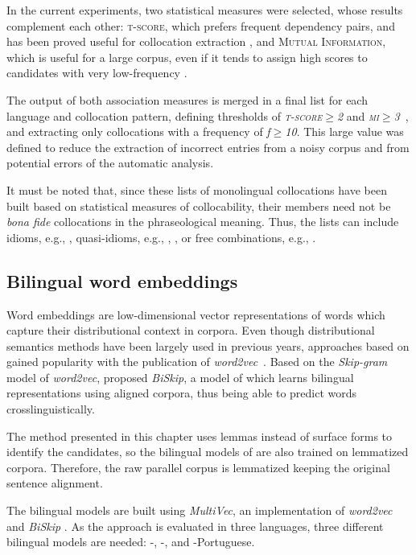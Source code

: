 \documentclass[output=paper,modfonts,nonflat]{langsci/langscibook}
\begin{document}
In the current experiments, two statistical measures were selected, whose results
complement each other: \textsc{t-score}, which prefers frequent dependency pairs,
and has been proved useful for collocation extraction \citep{krenn2001}, and
\textsc{Mutual Information}, which is useful for a large corpus, even if it
tends to assign high scores to candidates with very low-frequency \citep{pecina2010lexical}.

The output of both association measures is merged in a final list for each
language and collocation pattern, defining thresholds of \emph{\textsc{t-score$\geq$2}} and
\emph{\textsc{mi}$\geq$3}~\citep{stubbs1995}, and extracting only collocations with a frequency
of \emph{f$\geq$10}. This large value was defined to reduce the extraction of incorrect
entries from a noisy corpus and from potential errors of the automatic analysis.

It must be noted that, since these lists of monolingual collocations have been built
based on statistical measures of collocability, their members need not be
\emph{bona fide} collocations in the phraseological meaning. Thus, the lists can include
idioms, e.g., , quasi-idioms, e.g., , \citep{melcuk98}, or free combinations, e.g., .

%
\subsection{Bilingual word embeddings}
\label{garcia:sec:models}
Word embeddings are low-dimensional vector representations of words which
capture their distributional context in corpora. Even though distributional
semantics methods have been largely used in previous years, approaches based
on  gained popularity with the publication of \emph{word2vec}~\citep{mikolov2013}.
Based on the \emph{Skip-gram} model of \emph{word2vec}, \citet{bivec} proposed
\emph{BiSkip}, a model of  which learns bilingual representations
using aligned corpora, thus being able to predict words crosslinguistically.

The method presented in this chapter uses lemmas instead of surface forms to identify the
 candidates, so the bilingual models of  are also trained on
lemmatized corpora. Therefore, the raw parallel corpus is lemmatized keeping the original sentence alignment.

The bilingual models are built 
using \emph{MultiVec},
an implementation of \emph{word2vec} and \emph{BiSkip} \citep{MultiVec}. As the approach
is evaluated in three languages, three different bilingual models are needed:
-,  -, and -{Portu\-guese}.
\end{document}
